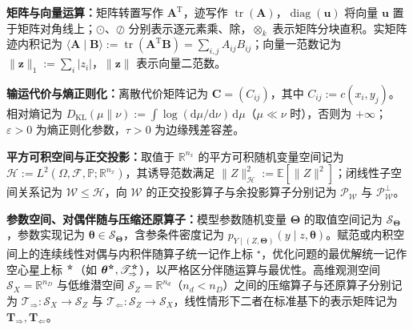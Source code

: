 \textbf{矩阵与向量运算：}矩阵转置写作 $\bm A^{\mathrm T}$，迹写作 $\operatorname{tr}(\bm A)$，$\operatorname{diag}(\bm u)$ 将向量 $\bm u$ 置于矩阵对角线上；$\odot$、$\oslash$ 分别表示逐元素乘、除，$\otimes_k$ 表示矩阵分块直积。实矩阵迹内积记为 $\langle\bm A\mid\bm B\rangle:=\operatorname{tr}(\bm A^{\mathrm T}\bm B)=\sum_{i,j}A_{ij}B_{ij}$；向量一范数记为 $\|\bm z\|_1:=\sum_i|z_i|$，$\|\bm z\|$ 表示向量二范数。

\textbf{输运代价与熵正则化：}离散代价矩阵记为 $\bm C=(C_{ij})$，其中 $C_{ij}:=c(x_i,y_j)$。相对熵记为 $D_{\mathrm{KL}}(\mu\|\nu):=\int\log(\mathrm d\mu/\mathrm d\nu)\,\mathrm d\mu$（$\mu\ll\nu$ 时），否则为 $+\infty$；$\varepsilon>0$ 为熵正则化参数，$\tau>0$ 为边缘残差容差。

\textbf{平方可积空间与正交投影：}取值于 $\mathbb R^{n_x}$ 的平方可积随机变量空间记为 $\mathcal H:=L^2(\Omega,\mathcal F,\mathbb P;\mathbb R^{n_x})$，其诱导范数满足 $\|Z\|_{\mathcal H}^2:=\mathbb E[\|Z\|^2]$；闭线性子空间关系记为 $\mathcal W\leqslant\mathcal H$，向 $\mathcal W$ 的正交投影算子与余投影算子分别记为 $\mathscr P_{\mathcal W}$ 与 $\mathscr P_{\mathcal W}^{\perp}$。

\textbf{参数空间、对偶伴随与压缩还原算子：}模型参数随机变量 $\bm\Theta$ 的取值空间记为 $\mathcal S_{\bm\Theta}$，参数实现记为 $\bm\theta\in\mathcal S_{\bm\Theta}$，含参条件密度记为 $p_{Y\mid(Z,\bm\Theta)}(y\mid z,\bm\theta)$。赋范或内积空间上的连续线性对偶与内积伴随算子统一记作上标 ${}^\star$，优化问题的最优解统一记作空心星上标 ${}^{\optstar}$（如 $\bm\theta^{\optstar},\mathscr T_{\Rightarrow}^{\optstar}$），以严格区分伴随运算与最优性。高维观测空间 $\mathcal S_X=\mathbb R^{n_D}$ 与低维潜空间 $\mathcal S_Z=\mathbb R^{n_d}$（$n_d<n_D$）之间的压缩算子与还原算子分别记为 $\mathscr T_{\Rightarrow}:\mathcal S_X\to\mathcal S_Z$ 与 $\mathscr T_{\Leftarrow}:\mathcal S_Z\to\mathcal S_X$，线性情形下二者在标准基下的表示矩阵记为 $\bm T_{\Rightarrow},\bm T_{\Leftarrow}$。

